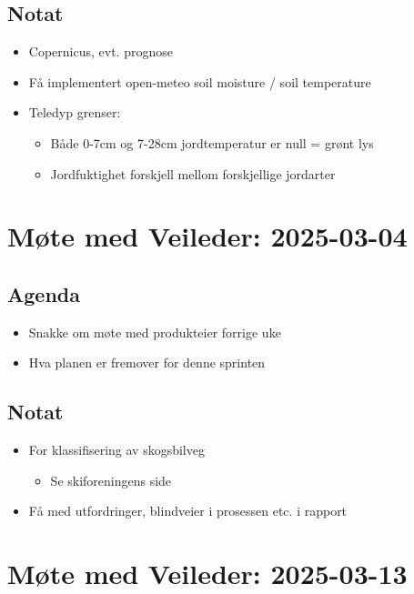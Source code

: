 \subsection*{Notat}
\begin{itemize}
\item
  Copernicus, evt. prognose
\item
  Få implementert open-meteo soil moisture / soil temperature
\item
  Teledyp grenser:

  \begin{itemize}
  \item
    Både 0-7cm og 7-28cm jordtemperatur er null = grønt lys
  \item
    Jordfuktighet forskjell mellom forskjellige jordarter
  \end{itemize}
\end{itemize}

\section*{Møte med Veileder: 2025-03-04}

\subsection*{Agenda}

\begin{itemize}
\item
  Snakke om møte med produkteier forrige uke
\item
  Hva planen er fremover for denne sprinten
\end{itemize}

\subsection*{Notat}

\begin{itemize}
\item
  For klassifisering av skogsbilveg

  \begin{itemize}
  \item
    Se skiforeningens side
  \end{itemize}
\item
  Få med utfordringer, blindveier i prosessen etc. i rapport
\end{itemize}

\section*{Møte med Veileder: 2025-03-13}

